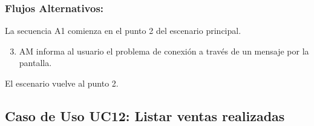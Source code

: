 \begin{framed}
\subsubsection{Flujos Alternativos: }

La secuencia A1 comienza en el punto 2 del escenario principal.
\begin{enumerate}
    \setcounter{enumi}{2}
    \item AM informa al usuario el problema de conexión a través de un mensaje por la pantalla.
\end{enumerate}
El escenario vuelve al punto 2.

\end{framed}


\subsection{Caso de Uso UC12: Listar ventas realizadas}

